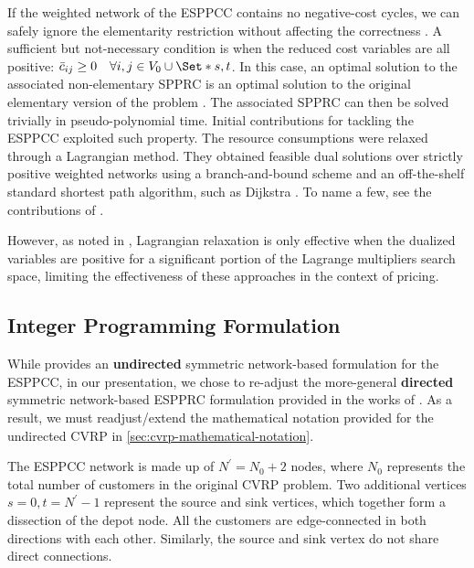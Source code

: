 If the weighted network of the ESPPCC contains no negative-cost cycles,
we can safely ignore the elementarity restriction without affecting the correctness \parencite{beasley1989}.
A sufficient but not-necessary condition is when the reduced cost variables
are all positive: $\bar{c}_{ij} \ge 0 \quad \forall i, j \in V_0 \cup \Set*{s, t}$.
In this case, an optimal solution to the associated non-elementary SPPRC
is an optimal solution to the original elementary version of the problem \parencite{beasley1989}.
The associated SPPRC can then be solved trivially in pseudo-polynomial time.
Initial contributions for tackling the ESPPCC exploited such property.
The resource consumptions were relaxed through a Lagrangian method.
They obtained feasible dual solutions over strictly positive weighted networks
using a branch-and-bound scheme and an off-the-shelf standard shortest path algorithm,
such as Dijkstra \parencite{sniedovich2006dijkstra}.
To name a few, see the contributions of \textcite{beasley1989, dumitrescu2003improved, carlyle2008, muhandiramge2009simultaneous}.

However, as noted in \textcite{righini2004},
Lagrangian relaxation is only effective when the dualized variables are positive
for a significant portion of the Lagrange multipliers search space,
limiting the effectiveness of these approaches in the context of pricing.

\subsection{Integer Programming Formulation}
\label{sec:espprc-integer-programming-formulation}

While \textcite{jepsen2008branchandcut} provides
an \textbf{undirected} symmetric network-based formulation for the ESPPCC,
in our presentation, we chose to re-adjust the more-general
\textbf{directed} symmetric network-based ESPPRC formulation
provided in the works of \textcite{beasley1989, toth2002, toth2014}.
As a result, we must readjust/extend the mathematical notation
provided for the undirected CVRP in \cref{sec:cvrp-mathematical-notation}.

\medskip

The ESPPCC network is made up of $N^\prime = N_0 + 2$ nodes,
where $N_0$ represents the total number of customers in the original CVRP problem.
Two additional vertices $s = 0, t = N^\prime - 1$ represent the source and sink vertices,
which together form a dissection of the depot node.
All the customers are edge-connected in both directions with each other.
Similarly, the source and sink vertex do not share direct connections.

